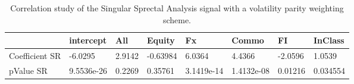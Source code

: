 \begin{table}[H]
\centering
\begin{tabular}{llllllll}
& intercept & All & Equity & Fx & Commo & FI & InClass \\ 
\hline 
Coefficient SR & -6.0295 & 2.9142 & -0.63984 & 6.0364 & 4.4366 & -2.0596 & 1.0539 \\ 
pValue SR & 9.5536e-26 & 0.2269 & 0.35761 & 3.1419e-14 & 1.4132e-08 & 0.01216 & 0.034554 \\ 
\hline
\end{tabular}
\caption{Correlation study of the Singular Sprectal Analysis signal with a volatility parity weighting scheme.}
\label{SSA_CORR}
\end{table}
